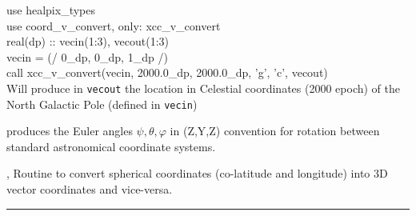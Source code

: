 \begin{example}
{
use healpix\_types \\
use coord\_v\_convert, only: xcc\_v\_convert \\
real(dp) :: vecin(1:3), vecout(1:3) \\
vecin = (/ 0\_dp, 0\_dp, 1\_dp /) \\
call xcc\_v\_convert(vecin, 2000.0\_dp, 2000.0\_dp, 'g', 'c', vecout)  \\
}
{Will produce in {\tt vecout} the location in Celestial coordinates (2000 epoch) of
the North Galactic Pole (defined in {\tt vecin})
}
\end{example}


\begin{related}
  \begin{sulist}{} %
   \item[\htmlref{coordsys2euler\_zyz}{sub:coordsys2euler_zyz}] produces the
Euler angles
 $\psi, \theta, \varphi$ in (Z,Y,Z) convention for rotation between standard astronomical coordinate systems.
  \item[\htmlref{ang2vec}{sub:ang2vec}, \htmlref{vec2ang}{sub:vec2ang}] Routine to convert spherical coordinates
  (co-latitude and longitude) into 3D vector coordinates and vice-versa.
  \end{sulist}
\end{related}

\rule{\hsize}{2mm}

\newpage
